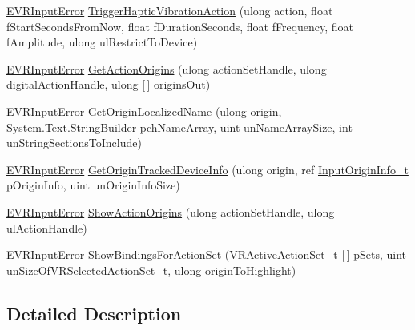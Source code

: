 \begin{DoxyCompactItemize}
\item 
\mbox{\hyperlink{namespace_valve_1_1_v_r_a592d7f4189b8346d6c96dbdbaa35bc1b}{E\+V\+R\+Input\+Error}} \mbox{\hyperlink{class_valve_1_1_v_r_1_1_c_v_r_input_a667dfa7b1d63a185be2614b8fb772077}{Trigger\+Haptic\+Vibration\+Action}} (ulong action, float f\+Start\+Seconds\+From\+Now, float f\+Duration\+Seconds, float f\+Frequency, float f\+Amplitude, ulong ul\+Restrict\+To\+Device)
\item 
\mbox{\hyperlink{namespace_valve_1_1_v_r_a592d7f4189b8346d6c96dbdbaa35bc1b}{E\+V\+R\+Input\+Error}} \mbox{\hyperlink{class_valve_1_1_v_r_1_1_c_v_r_input_a3558bf9618b7b75df19f79741aa32fc9}{Get\+Action\+Origins}} (ulong action\+Set\+Handle, ulong digital\+Action\+Handle, ulong \mbox{[}$\,$\mbox{]} origins\+Out)
\item 
\mbox{\hyperlink{namespace_valve_1_1_v_r_a592d7f4189b8346d6c96dbdbaa35bc1b}{E\+V\+R\+Input\+Error}} \mbox{\hyperlink{class_valve_1_1_v_r_1_1_c_v_r_input_ab948e02dd80ff0dbafdcf374182c283f}{Get\+Origin\+Localized\+Name}} (ulong origin, System.\+Text.\+String\+Builder pch\+Name\+Array, uint un\+Name\+Array\+Size, int un\+String\+Sections\+To\+Include)
\item 
\mbox{\hyperlink{namespace_valve_1_1_v_r_a592d7f4189b8346d6c96dbdbaa35bc1b}{E\+V\+R\+Input\+Error}} \mbox{\hyperlink{class_valve_1_1_v_r_1_1_c_v_r_input_ad5e2114c76544ba963f7cf40a9a03d2b}{Get\+Origin\+Tracked\+Device\+Info}} (ulong origin, ref \mbox{\hyperlink{struct_valve_1_1_v_r_1_1_input_origin_info__t}{Input\+Origin\+Info\+\_\+t}} p\+Origin\+Info, uint un\+Origin\+Info\+Size)
\item 
\mbox{\hyperlink{namespace_valve_1_1_v_r_a592d7f4189b8346d6c96dbdbaa35bc1b}{E\+V\+R\+Input\+Error}} \mbox{\hyperlink{class_valve_1_1_v_r_1_1_c_v_r_input_a9e307e6a2f80eb19e9de3dcf676bb1ef}{Show\+Action\+Origins}} (ulong action\+Set\+Handle, ulong ul\+Action\+Handle)
\item 
\mbox{\hyperlink{namespace_valve_1_1_v_r_a592d7f4189b8346d6c96dbdbaa35bc1b}{E\+V\+R\+Input\+Error}} \mbox{\hyperlink{class_valve_1_1_v_r_1_1_c_v_r_input_a3d925c06fcc1c105789a39a8079fe687}{Show\+Bindings\+For\+Action\+Set}} (\mbox{\hyperlink{struct_valve_1_1_v_r_1_1_v_r_active_action_set__t}{V\+R\+Active\+Action\+Set\+\_\+t}} \mbox{[}$\,$\mbox{]} p\+Sets, uint un\+Size\+Of\+V\+R\+Selected\+Action\+Set\+\_\+t, ulong origin\+To\+Highlight)
\end{DoxyCompactItemize}


\subsection{Detailed Description}


